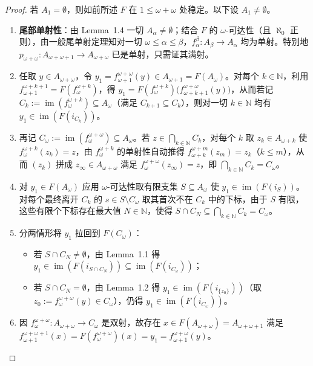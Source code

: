 \documentclass[11pt,a4paper]{ctexart}
\theoremstyle{plain}
\newcommand{\im}{\operatorname{im}}
\begin{document}
\begin{proof}
若 $A_1 = \emptyset$，则如前所述 $F$ 在 $1 \le \omega + \omega$ 处稳定。以下设 $A_1 \neq \emptyset$。
\begin{enumerate}[label=(\arabic*)]
  \item \textbf{尾部单射性}：由 Lemma~1.4 一切 $A_\alpha \neq \emptyset$；结合 $F$ 的 $\omega$-可达性（且 $\aleph_0$ 正则），由一般尾单射定理知对一切 $\omega \le \alpha \le \beta$，$f_\alpha^\beta : A_\beta \to A_\alpha$ 均为单射。特别地 $p_{\omega+\omega} : A_{\omega+\omega+1} \to A_{\omega+\omega}$ 已是单射，只需证其满射。
  \item 任取 $y \in A_{\omega+\omega}$，令 $y_1 = f_{\omega+1}^{\omega+\omega}(y) \in A_{\omega+1} = F(A_\omega)$。对每个 $k \in \mathbb{N}$，利用 $f_{\omega+1}^{\omega+k+1} = F(f_\omega^{\omega+k})$，得 $y_1 = F(f_\omega^{\omega+k})\bigl(f_{\omega+k+1}^{\omega+\omega}(y)\bigr)$，从而若记 $C_k := \im(f_\omega^{\omega+k}) \subseteq A_\omega$（满足 $C_{k+1} \subseteq C_k$），则对一切 $k \in \mathbb{N}$ 均有 $y_1 \in \im(F(i_{C_k}))$。
  \item 再记 $C_\omega := \im(f_\omega^{\omega+\omega}) \subseteq A_\omega$。若 $z \in \bigcap_{k \in \mathbb{N}} C_k$，对每个 $k$ 取 $z_k \in A_{\omega+k}$ 使 $f_\omega^{\omega+k}(z_k) = z$，由 $f_\omega^{\omega+k}$ 的单射性自动推得 $f_{\omega+k}^{\omega+m}(z_m) = z_k$（$k \le m$），从而 $(z_k)$ 拼成 $z_\infty \in A_{\omega+\omega}$ 满足 $f_\omega^{\omega+\omega}(z_\infty) = z$，即 $\bigcap_{k \in \mathbb{N}} C_k = C_\omega$。
  \item 对 $y_1 \in F(A_\omega)$ 应用 $\omega$-可达性取有限支集 $S \subseteq A_\omega$ 使 $y_1 \in \im(F(i_S))$。对每个最终离开 $C_k$ 的 $s \in S \setminus C_\omega$ 取其首次不在 $C_k$ 中的下标，由于 $S$ 有限，这些有限个下标存在最大值 $N \in \mathbb{N}$，使得 $S \cap C_N \subseteq \bigcap_{k \in \mathbb{N}} C_k = C_\omega$。
  \item 分两情形将 $y_1$ 拉回到 $F(C_\omega)$：
    \begin{itemize}
      \item 若 $S \cap C_N \neq \emptyset$，由 Lemma~1.1 得 $y_1 \in \im(F(i_{S \cap C_N})) \subseteq \im(F(i_{C_\omega}))$；
      \item 若 $S \cap C_N = \emptyset$，由 Lemma~1.2 得 $y_1 \in \im(F(i_{\{z_0\}}))$（取 $z_0 := f_\omega^{\omega+\omega}(y) \in C_\omega$），仍得 $y_1 \in \im(F(i_{C_\omega}))$。
    \end{itemize}
  \item 因 $f_\omega^{\omega+\omega} : A_{\omega+\omega} \to C_\omega$ 是双射，故存在 $x \in F(A_{\omega+\omega}) = A_{\omega+\omega+1}$ 满足 $f_{\omega+1}^{\omega+\omega+1}(x) = F(f_\omega^{\omega+\omega})(x) = y_1 = f_{\omega+1}^{\omega+\omega}(y)$。

\end{enumerate}
\end{proof}
\end{document}
